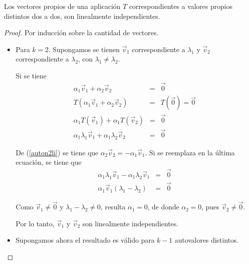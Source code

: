 \begin{theorem}

\label{PROPOSICION4}



Los vectores propios de una aplicación $T$ correspondientes a valores propios distintos dos a dos, son linealmente independientes.

\begin{proof}
Por inducción sobre la cantidad de vectores. 
\begin{itemize}
\item

Para $k=2$.
Supongamos se tienen $\Vec{v}_1$ correspondiente a $ \lambda_1 $ y $\Vec{v}_2$ correspondiente a $ \lambda_2 $, con $ \lambda_1  \neq \lambda_2 $.  

Si se tiene
\begin{eqnarray}
\label{auton2li}
 \alpha_1 \Vec{v}_1 + \alpha_2 \Vec{v}_2 &= &\Vec{0} \\
 T(\alpha_1 \Vec{v}_1 + \alpha_2 \Vec{v}_2 )&=&T( \Vec{0})=\Vec{0} \nonumber\\
\alpha_1 T(\Vec{v}_1) + \alpha_1 T(\Vec{v}_2 )&=&\Vec{0} \nonumber\\
\alpha_1 \lambda_1\Vec{v}_1 + \alpha_1 \lambda_2\Vec{v}_2 &=&\Vec{0} \nonumber
\end{eqnarray}

\bigskip

 De (\ref{auton2li}) se tiene que  $  \alpha_2 \Vec{v}_2 = - \alpha_1 \Vec{v}_1$. Si se reemplaza en la última ecuación, se tiene que
\begin{eqnarray}
 \alpha_1 \lambda_1\Vec{v}_1 - \alpha_1 \lambda_2 \Vec{v}_1 &=&\Vec{0} \nonumber\\
 \alpha_1 \Vec{v}_1( \lambda_1 - \lambda_2) &=&\Vec{0} 
 \end{eqnarray}


\bigskip 

 Como $\Vec{v}_1 \neq \Vec{0}$ y $ \lambda_1 - \lambda_2 \neq  0$, resulta  $ \alpha_1=0$, de donde  $ \alpha_2=0$, pues
 $\Vec{v}_2 \neq \Vec{0}$.

 \bigskip 
 
 Por lo tanto, $\Vec{v}_1$ y $\Vec{v}_2$ son linealmente independientes.


  \bigskip 
  
\item

Supongamos ahora el resultado es válido para $k-1$ autovalores distintos.


\end{itemize}
\end{proof}
\end{theorem}
